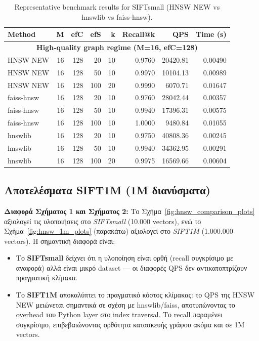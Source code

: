 \documentclass[12pt,a4paper]{article}
\begin{document}
\begin{table}[H]
\centering
\caption{Representative benchmark results for SIFTsmall (HNSW NEW vs hnswlib vs faiss-hnsw).}
\label{tab:bench_siftsmall_representative}

\begin{tabular}{lrrrrrrr}
\toprule
\textbf{Method} & \textbf{M} & \textbf{efC} & \textbf{efS} & \textbf{k} &
\textbf{Recall@k} & \textbf{QPS} & \textbf{Time (s)} \\
\midrule

\multicolumn{8}{c}{\textbf{High-quality graph regime (M=16, efC=128)}}\\
\midrule

HNSW NEW   & 16 & 128 & 20  & 10 & 0.9760 & 20420.81 & 0.00490 \\
HNSW NEW   & 16 & 128 & 50  & 10 & 0.9970 & 10104.13 & 0.00989 \\
HNSW NEW   & 16 & 128 & 100 & 20 & 0.9990 &  6070.71 & 0.01647 \\

\midrule

faiss-hnsw & 16 & 128 & 20  & 10 & 0.9760 & 28042.44 & 0.00357 \\
faiss-hnsw & 16 & 128 & 50  & 10 & 0.9940 & 17396.31 & 0.00575 \\
faiss-hnsw & 16 & 128 & 100 & 10 & 1.0000 &  9480.84 & 0.01055 \\

\midrule

hnswlib    & 16 & 128 & 20  & 10 & 0.9750 & 40808.36 & 0.00245 \\
hnswlib    & 16 & 128 & 50  & 10 & 0.9940 & 34362.95 & 0.00291 \\
hnswlib    & 16 & 128 & 100 & 20 & 0.9975 & 16569.66 & 0.00604 \\

\bottomrule
\end{tabular}
\end{table}

\subsection{Αποτελέσματα SIFT1M (1M διανύσματα)}

\textbf{Διαφορά Σχήματος 1 και Σχήματος 2:} Το Σχήμα~\ref{fig:hnsw_comparison_plots} αξιολογεί τις υλοποιήσεις στο \emph{SIFTsmall} (10.000 vectors), ενώ το Σχήμα~\ref{fig:hnsw_1m_plots} (παρακάτω) αξιολογεί στο \emph{SIFT1M} (1.000.000 vectors). Η σημαντική διαφορά είναι:
\begin{itemize}
  \item Το \textbf{SIFTsmall} δείχνει ότι η υλοποίηση είναι ορθή (recall συγκρίσιμο με αναφορά) αλλά είναι μικρό dataset — οι διαφορές QPS δεν αντικατοπτρίζουν πραγματική κλίμακα.
  \item Το \textbf{SIFT1M} αποκαλύπτει το πραγματικό κόστος κλίμακας: το QPS της HNSW NEW μειώνεται σημαντικά σε σχέση με hnswlib/faiss, αποτυπώνοντας το overhead του Python layer στο index traversal. Το recall παραμένει συγκρίσιμο, επιβεβαιώνοντας ορθότητα κατασκευής γράφου ακόμα και σε 1M vectors.
\end{itemize}
\end{document}
